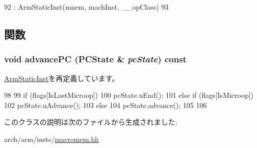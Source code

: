 \begin{DoxyCode}
92             : ArmStaticInst(mnem, machInst, __opClass)
93     {}
\end{DoxyCode}


\subsection{関数}
\hypertarget{classArmISA_1_1MicroOpX_af04cd01429462d48e635f3e01ced6257}{
\subsubsection[{advancePC}]{\setlength{\rightskip}{0pt plus 5cm}void advancePC (PCState \& {\em pcState}) const}}
\label{classArmISA_1_1MicroOpX_af04cd01429462d48e635f3e01ced6257}


\hyperlink{classArmISA_1_1ArmStaticInst_af04cd01429462d48e635f3e01ced6257}{ArmStaticInst}を再定義しています。


\begin{DoxyCode}
98     {
99         if (flags[IsLastMicroop]) {
100             pcState.uEnd();
101         } else if (flags[IsMicroop]) {
102             pcState.uAdvance();
103         } else {
104             pcState.advance();
105         }
106     }
\end{DoxyCode}


このクラスの説明は次のファイルから生成されました:\begin{DoxyCompactItemize}
\item 
arch/arm/insts/\hyperlink{macromem_8hh}{macromem.hh}\end{DoxyCompactItemize}
